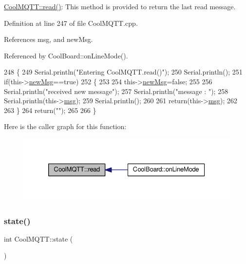 \hyperlink{classCoolMQTT_ae3c18f6ae9723746d32765f1c8f176ca}{Cool\+M\+Q\+T\+T\+::read()}\+: This method is provided to return the last read message. 

Definition at line 247 of file Cool\+M\+Q\+T\+T.\+cpp.



References msg, and new\+Msg.



Referenced by Cool\+Board\+::on\+Line\+Mode().


\begin{DoxyCode}
248 \{   
249     Serial.println(\textcolor{stringliteral}{"Entering CoolMQTT.read()"});
250     Serial.println();
251     \textcolor{keywordflow}{if}(this->\hyperlink{classCoolMQTT_a3240388137b885775aadf38e96b24c6b}{newMsg}==\textcolor{keyword}{true})
252     \{
253         
254         this->\hyperlink{classCoolMQTT_a3240388137b885775aadf38e96b24c6b}{newMsg}=\textcolor{keyword}{false};
255 
256         Serial.println(\textcolor{stringliteral}{"received new message"});
257         Serial.println(\textcolor{stringliteral}{"message : "});
258         Serial.println(this->\hyperlink{classCoolMQTT_af6b19e7074dbbb4ae493c44dcb53f7ff}{msg});
259         Serial.println();
260                 
261         \textcolor{keywordflow}{return}(this->\hyperlink{classCoolMQTT_af6b19e7074dbbb4ae493c44dcb53f7ff}{msg});
262         
263     \}
264     \textcolor{keywordflow}{return}(\textcolor{stringliteral}{""});
265 
266 \}
\end{DoxyCode}
Here is the caller graph for this function\+:
\nopagebreak
\begin{figure}[H]
\begin{center}
\leavevmode
\includegraphics[width=326pt]{classCoolMQTT_ae3c18f6ae9723746d32765f1c8f176ca_icgraph}
\end{center}
\end{figure}
\mbox{\label{classCoolMQTT_a5d003307eff78efbd585e42b43b72b6d}} 
\subsubsection{\texorpdfstring{state()}{state()}}
{\footnotesize\ttfamily int Cool\+M\+Q\+T\+T\+::state (\begin{DoxyParamCaption}{ }\end{DoxyParamCaption})}

